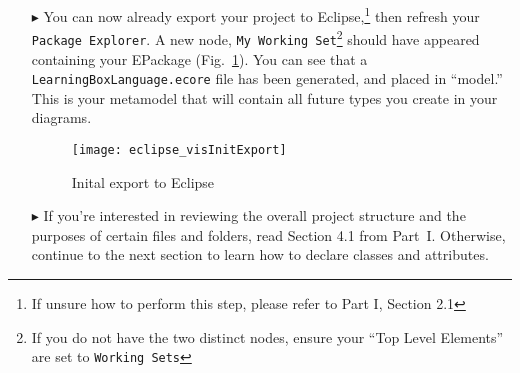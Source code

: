 \begin{itemize}
\item[$\blacktriangleright$] You can now already export your project to Eclipse,\footnote{If unsure how to perform this step, please refer to Part I, Section
2.1} then refresh your \texttt{Package Explorer}. A new node, \texttt{My Working Set}\footnote{If you do not have the two distinct nodes, ensure your ``Top
Level Elements'' are set to \texttt{Working Sets}} should have appeared containing your EPackage (Fig.~\ref{fig:init_export}). You can see that a
\texttt{LearningBoxLanguage.ecore} file has been generated, and placed in ``model.'' This is your metamodel that will contain all future types you create in
your diagrams.

\clearpage

\vspace*{2cm}

\begin{figure}[htbp]
	\centering
  \texttt{[image: eclipse\_visInitExport]}
	\caption{Inital export to Eclipse}
	\label{fig:init_export}
\end{figure}

\vspace{1cm}

\item[$\blacktriangleright$] If you're interested in reviewing the overall project structure and the purposes of certain files and folders, read Section 4.1
from Part~I. Otherwise, continue to the next section to learn how to declare classes and attributes.

\end{itemize}
